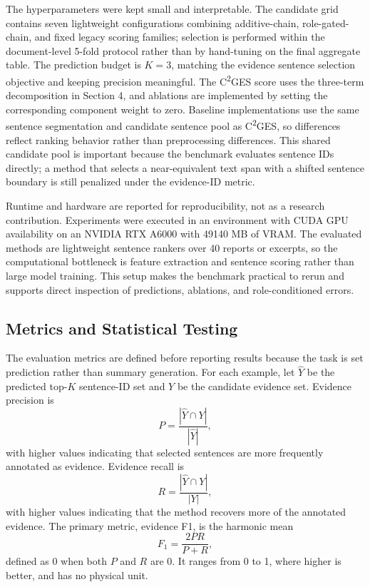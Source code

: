 \documentclass{ieeeaccess}
\begin{document}
The hyperparameters were kept small and interpretable. The candidate grid contains seven lightweight configurations combining additive-chain, role-gated-chain, and fixed legacy scoring families; selection is performed within the document-level 5-fold protocol rather than by hand-tuning on the final aggregate table. The prediction budget is \(K=3\), matching the evidence sentence selection objective and keeping precision meaningful. The C\textsuperscript{2}GES score uses the three-term decomposition in Section 4, and ablations are implemented by setting the corresponding component weight to zero. Baseline implementations use the same sentence segmentation and candidate sentence pool as C\textsuperscript{2}GES, so differences reflect ranking behavior rather than preprocessing differences. This shared candidate pool is important because the benchmark evaluates sentence IDs directly; a method that selects a near-equivalent text span with a shifted sentence boundary is still penalized under the evidence-ID metric.

Runtime and hardware are reported for reproducibility, not as a research contribution. Experiments were executed in an environment with CUDA GPU availability on an NVIDIA RTX A6000 with 49140 MB of VRAM. The evaluated methods are lightweight sentence rankers over 40 reports or excerpts, so the computational bottleneck is feature extraction and sentence scoring rather than large model training. This setup makes the benchmark practical to rerun and supports direct inspection of predictions, ablations, and role-conditioned errors.

\subsection{Metrics and Statistical Testing}

\label{sec:metrics_and_statistical_testing}

The evaluation metrics are defined before reporting results because the task is set prediction rather than summary generation. For each example, let \(\hat{Y}\) be the predicted top-\(K\) sentence-ID set and \(Y\) be the candidate evidence set. Evidence precision is
\[
P=\frac{|\hat{Y}\cap Y|}{|\hat{Y}|},
\]
with higher values indicating that selected sentences are more frequently annotated as evidence. Evidence recall is
\[
R=\frac{|\hat{Y}\cap Y|}{|Y|},
\]
with higher values indicating that the method recovers more of the annotated evidence. The primary metric, evidence F1, is the harmonic mean
\[
F_1=\frac{2PR}{P+R},
\]
defined as 0 when both \(P\) and \(R\) are 0. It ranges from 0 to 1, where higher is better, and has no physical unit.
\end{document}
